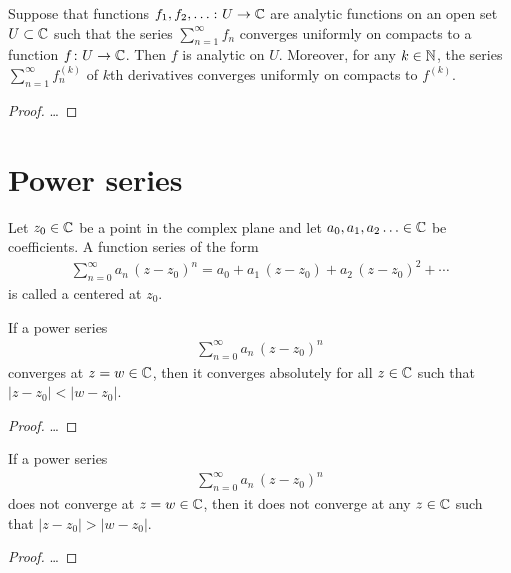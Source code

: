 \begin{lemma}
  \label{lem:uoc_analytic_series}
  Suppose that functions $f_1, f_2, \ldots \colon U \to \mathbb{C}$
  are analytic functions on an open set $U \subset \mathbb{C}$
  such that the series
  $\sum_{n=1}^\infty f_n$ converges uniformly on compacts to a
  function $f \colon U \to \mathbb{C}$. Then $f$ is analytic on $U$.
  Moreover, for any $k \in \mathbb{N}$, the series $\sum_{n=1}^\infty f^{(k)}_n$
  of $k$th derivatives converges uniformly on compacts to $f^{(k)}$.
\end{lemma}
\begin{proof}
  \ldots
\end{proof}



\section{Power series}

\begin{definition}
  \label{def:power_series}
  Let $z_0 \in \mathbb{C}$ be a point in the complex plane
  and let $a_0,a_1,a_2\ldots \in \mathbb{C}$ be coefficients.
  A function series of the form
  \begin{align*}
  \sum_{n=0}^\infty a_n \, (z-z_0)^n
    = a_0 + a_1 \, (z - z_0) + a_2 \, (z - z_0)^2 + \cdots
  \end{align*}
  is called a  centered at $z_0$.
\end{definition}

\begin{lemma}
  \label{lem:abel}
  If a power series
  \begin{align*}
    \sum_{n=0}^\infty a_n \, (z-z_0)^n
  \end{align*}
  converges at $z = w \in \mathbb{C}$, then it converges
  absolutely for all $z \in \mathbb{C}$ such that $|z-z_0| < |w-z_0|$.
\end{lemma}
\begin{proof}
  \ldots
\end{proof}

\begin{corollary}
  \label{cor:abel_contrapositive}
  If a power series
  \begin{align*}
    \sum_{n=0}^\infty a_n \, (z-z_0)^n
  \end{align*}
  does not converge at $z = w \in \mathbb{C}$, then it does not converge
  at any $z \in \mathbb{C}$ such that $|z-z_0| > |w-z_0|$.
\end{corollary}
\begin{proof}
  \ldots
\end{proof}

